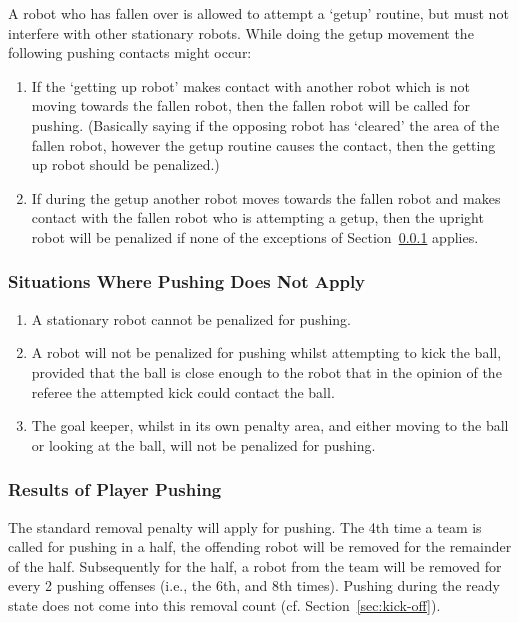 \documentclass[12pt]{article}
\newcommand{\cf}{\mbox{cf.}\xspace}
\begin{document}
A robot who has fallen over is allowed to attempt a `getup' routine, but must not interfere with other stationary robots.
While doing the getup movement the following pushing contacts might occur:

\begin{enumerate}
	\item If the `getting up robot' makes contact with another robot which is not moving towards the fallen robot, then the fallen robot will be called for pushing. (Basically saying if the opposing robot has `cleared' the area of the fallen robot, however the getup routine causes the contact, then the getting up robot should be penalized.)
	\item If during the getup another robot moves towards the fallen robot and makes contact with the fallen robot who is attempting a getup, then the upright robot will be penalized if none of the exceptions of Section~\ref{sec:situations_no_pushing} applies.
\end{enumerate}


\subsubsection{Situations Where Pushing Does Not Apply}
\label{sec:situations_no_pushing}

\begin{enumerate}
	\item A stationary robot cannot be penalized for pushing.
	\item A robot will not be penalized for pushing whilst attempting to kick the ball, provided that the ball is close enough to the robot that in the opinion of the referee the attempted kick could contact the ball.
	\item The goal keeper, whilst in its own penalty area, and either moving to the ball or looking at the ball, will not be penalized for pushing.
\end{enumerate}


\subsubsection{Results of Player Pushing}
\label{sec:pushing_results}

The standard removal penalty will apply for pushing. The 4th time a team is called for pushing in a half, the offending robot will be removed for the remainder of the half. Subsequently for the half, a robot from the team will be removed for every 2 pushing offenses (i.e., the 6th, and 8th times).
Pushing during the ready state does not come into this removal count (\cf Section~\ref{sec:kick-off}).
\end{document}
